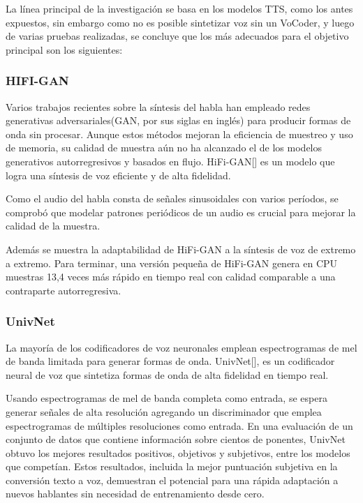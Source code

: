   La línea principal de la investigación se basa en los modelos TTS, como los antes expuestos, sin embargo como no es posible sintetizar voz sin un VoCoder, y luego de varias pruebas realizadas, se concluye que los más adecuados para el objetivo principal son los siguientes:
  
\subsubsection{HIFI-GAN}
Varios trabajos recientes sobre la síntesis del habla han empleado redes generativas adversariales(GAN, por sus siglas en inglés) para producir formas de onda sin procesar. Aunque estos métodos mejoran la eficiencia de muestreo y uso de memoria, su calidad de muestra aún no ha alcanzado el de los modelos generativos autorregresivos y basados en flujo. HiFi-GAN[\cite{kong2020hifi}] es un modelo que logra una síntesis de voz eficiente y de alta fidelidad.

Como el audio del habla consta de señales sinusoidales con varios períodos, se comprobó que modelar patrones periódicos de un audio es crucial para mejorar la calidad de la muestra.

Además se muestra la adaptabilidad de HiFi-GAN a la síntesis de voz de extremo a extremo. Para terminar, una versión pequeña de HiFi-GAN genera en CPU muestras 13,4 veces más rápido en tiempo real con calidad comparable a una contraparte autorregresiva.


\subsubsection{UnivNet}
La mayoría de los codificadores de voz neuronales emplean espectrogramas de mel de banda limitada para generar formas de onda. UnivNet[\cite{jang2021univnet}], es un codificador neural de voz que sintetiza formas de onda de alta fidelidad en tiempo real. 

Usando espectrogramas de mel de banda completa como entrada, se espera generar señales de alta resolución agregando un discriminador que emplea espectrogramas de múltiples resoluciones como entrada. En una evaluación de un conjunto de datos que contiene información sobre cientos de ponentes, UnivNet obtuvo los mejores resultados positivos, objetivos y subjetivos,  entre los modelos que competían. Estos resultados, incluida la mejor puntuación subjetiva en la conversión texto a voz, demuestran el potencial para una rápida adaptación a nuevos hablantes sin necesidad de entrenamiento desde cero.

